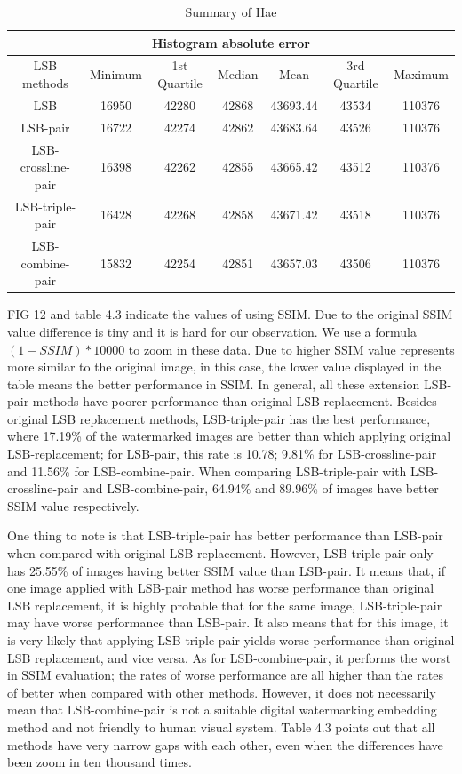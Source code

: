 \begin{table}
\centering
\begin{tabular}{|c|c|c|c|c|c|c|}
 \hline
 \multicolumn{7}{|c|}{Histogram absolute error} \\
 \hline
 LSB methods        &Minimum&1st Quartile	&Median	&Mean	    &3rd Quartile	&Maximum\\
 \hline
 LSB&               16950	&42280	        &42868	&43693.44	&43534	        &110376\\
 \hline
 LSB-pair	        &16722	&42274	        &42862	&43683.64	&43526	        &110376\\
 \hline
 LSB-crossline-pair	&16398	&42262	        &42855	&43665.42	&43512	        &110376\\
 \hline
 LSB-triple-pair	&16428	&42268	        &42858	&43671.42	&43518	        &110376\\
 \hline
 LSB-combine-pair	&15832	&42254	        &42851	&43657.03	&43506	        &110376\\
 \hline
\end{tabular}
 \caption{Summary of Hae}
\end{table}


FIG 12 and table 4.3 indicate the values of using SSIM. Due to the original SSIM value difference is tiny and it is hard for our observation. We use a formula \((1 - SSIM) * 10000\) to zoom in these data. Due to higher SSIM value represents more similar to the original image, in this case, the lower value displayed in the table means the better performance in SSIM. In general, all these extension LSB-pair methods have poorer performance than original LSB replacement. Besides original LSB replacement methods, LSB-triple-pair has the best performance, where 17.19\% of the watermarked images are better than which applying original LSB-replacement; for LSB-pair, this rate is 10.78; 9.81\% for LSB-crossline-pair and 11.56\% for LSB-combine-pair. When comparing LSB-triple-pair with LSB-crossline-pair and LSB-combine-pair, 64.94\% and 89.96\% of images have better SSIM value respectively. 

One thing to note is that LSB-triple-pair has better performance than LSB-pair when compared with original LSB replacement. However, LSB-triple-pair only has 25.55\% of images having better SSIM value than LSB-pair. It means that, if one image applied with LSB-pair method has worse performance than original LSB replacement, it is highly probable that for the same image, LSB-triple-pair may have worse performance than LSB-pair. It also means that for this image, it is very likely that applying LSB-triple-pair yields worse performance than original LSB replacement, and vice versa. As for LSB-combine-pair, it performs the worst in SSIM evaluation; the rates of worse performance are all higher than the rates of better when compared with other methods. However, it does not necessarily mean that LSB-combine-pair is not a suitable digital watermarking embedding method and not friendly to human visual system. Table 4.3 points out that all methods have very narrow gaps with each other, even when the differences have been zoom in ten thousand times. 

